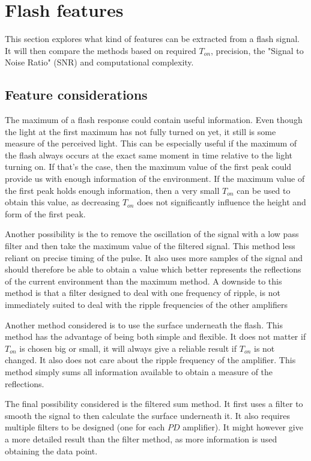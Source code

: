 \section{Flash features}
This section explores what kind of features can be extracted from a flash signal. It will then compare the methods based on required $T_{on}$, precision, the "Signal to Noise Ratio" (SNR) and computational complexity.

\subsection{Feature considerations}
The maximum of a flash response could contain useful information. Even though the light at the first maximum has not fully turned on yet, it still is some measure of the perceived light. This can be especially useful if the maximum of the flash always occurs at the exact same moment in time relative to the light turning on. If that's the case, then the maximum value of the first peak could provide us with enough information of the environment. If the maximum value of the first peak holds enough information, then a very small $T_{on}$ can be used to obtain this value, as decreasing $T_{on}$ does not significantly influence the height and form of the first peak.

Another possibility is the to remove the oscillation of the signal with a low pass filter and then take the maximum value of the filtered signal. This method less reliant on precise timing of the pulse. It also uses more samples of the signal and should therefore be able to obtain a value which better represents the reflections of the current environment than the maximum method. A downside to this method is that a filter designed to deal with one frequency of ripple, is not immediately suited to deal with the ripple frequencies of the other amplifiers

Another method considered is to use the surface underneath the flash. This method has the advantage of being both simple and flexible. It does not matter if $T_{on}$ is chosen big or small, it will always give a reliable result if $T_{on}$ is not changed. It also does not care about the ripple frequency of the amplifier. This method simply sums all information available to obtain a measure of the reflections.

The final possibility considered is the filtered sum method. It first uses a filter to smooth the signal to then calculate the surface underneath it. It also requires multiple filters to be designed (one for each $PD$ amplifier). It might however give a more detailed result than the filter method, as more information is used obtaining the data point.

